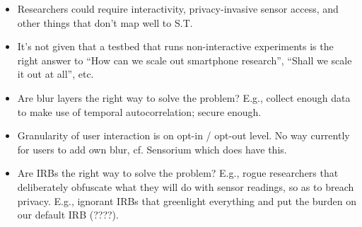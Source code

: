 \begin{itemize}
  \item Researchers could require interactivity, privacy-invasive 
sensor access, and other things that don't map well to S.T.
  \item It's not given that a testbed that runs non-interactive 
experiments is the right answer to ``How can we scale out 
smartphone research'', ``Shall we scale it out at all'', etc.
  \item Are blur layers the right way to solve the problem? E.g., 
collect enough data to make use of temporal autocorrelation; secure enough.
  \item Granularity of user interaction is on opt-in / opt-out 
level. No way currently for users to add own blur, cf. Sensorium 
which does have this.
  \item Are IRBs the right way to solve the problem? E.g., 
rogue researchers that deliberately obfuscate what they will 
do with sensor readings, so as to breach privacy. E.g., 
ignorant IRBs that greenlight everything and put the burden on 
our default IRB (????).
\end{itemize}
